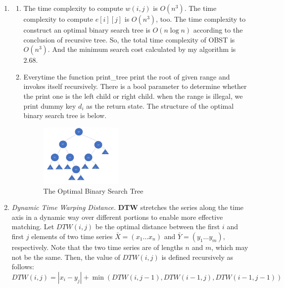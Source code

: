\documentclass[12pt,a4paper]{article}
\makeatletter
\newtheorem*{solution}{Solution}
\theoremstyle{definition}
\renewenvironment{solution}[1][Solution] {\par\pushQED{\qed}\normalfont\topsep6\p@\@plus6\p@\relax\trivlist\item[\hskip\labelsep\bfseries#1\@addpunct{.}]\ignorespaces}{\popQED\endtrivlist\@endpefalse} \makeatother
\makeatother
\begin{document}
\begin{enumerate}
\begin{solution}
\begin{enumerate}
\begin{algorithm}[H]
						\end{algorithm}
					\item The time complexity to compute $w(i,j)$ is $O(n^3)$. The time complexity to compute $e[i][j]$ is $O(n^3)$, too. The time complexity to construct an optimal binary search tree is $O(n\log n)$ according to the conclusion of recursive tree. So, the total time complexity of OBST is $O(n^3)$.
					And the minimum search cost calculated by my algorithm is $2.68$.
					\item Everytime the function print\_tree print the root of given range and invokes itself recursively. There is a bool parameter to determine whether the print one is the left child or right child. when the range is illegal, we print dummy key $d_i$ as the return state. The structure of the optimal binary search tree is below.
					\\\begin{figure}[htbp]
						\centering
						\includegraphics[width=0.4\textwidth]{OBST.pdf}
						\caption{The Optimal Binary Search Tree}\label{OBST}
					\end{figure}
				\end{enumerate}
		    \end{solution}
		
		\item \textit{Dynamic Time Warping Distance.} \textbf{DTW} stretches the series along the time axis in a dynamic way over different
		portions to enable more effective matching. Let $D T W(i, j)$ be the optimal distance between the first $i$ and first $j$ elements of two time series $\bar{X}=\left(x_{1} \ldots x_{n}\right)$ and $\bar{Y}=\left(y_{1} \ldots y_{m}\right),$ respectively. Note that the two time series are of lengths $n$ and $m$, which may not be the same. Then, the value of $D T W(i, j)$ is defined recursively as follows:
		$$
		DTW(i, j)=\left|x_{i}- y_{j}\right|+\min(DTW(i, j-1), DTW(i-1, j), DTW(i-1, j-1))
		$$
		

\end{enumerate}
\end{document}
